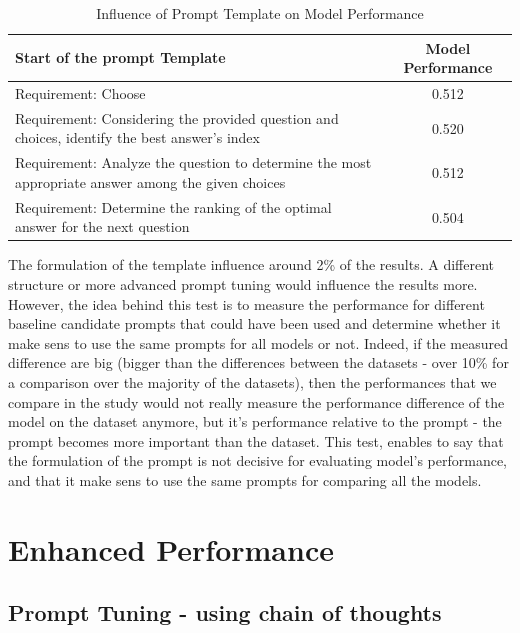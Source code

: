 \documentclass{article}
\begin{document}
    \begin{table}[htbp]
        \centering
        \caption{Influence of Prompt Template on Model Performance}
        \label{tab:prompt_performance}
        \begin{tabular}{p{8cm}c}
          \toprule
          \textbf{Start of the prompt Template} & \textbf{Model Performance} \\
          \midrule
          Requirement: Choose & 0.512 \\
          Requirement: Considering the provided question and choices, identify the best answer's index & 0.520 \\
          Requirement: Analyze the question to determine the most appropriate answer among the given choices & 0.512 \\
          Requirement: Determine the ranking of the optimal answer for the next question & 0.504 \\
          \bottomrule
        \end{tabular}
      \end{table}

      The formulation of the template influence around 2\% of the results.
      A different structure or more advanced prompt tuning would influence the results more.
      However, the idea behind this test is to measure the performance for different baseline candidate prompts that could have been used and determine whether it make sens to use the same prompts for all models or not.
      Indeed, if the measured difference are big (bigger than the differences between the datasets - over 10\% for a comparison over the majority of the datasets), then the performances that we compare in the study would not really measure the performance difference of the model on the dataset anymore, but it's performance relative to the prompt - the prompt becomes more important than the dataset.
      This test, enables to say that the formulation of the prompt is not decisive for evaluating model's performance, and that it make sens to use the same prompts for comparing all the models.
    

    \section{Enhanced Performance}\label{sec:enhanced-performance}

    \subsection{Prompt Tuning - using chain of thoughts}\label{subsec:prompt-tuning---using-chain-of-thoughts}
\end{document}
